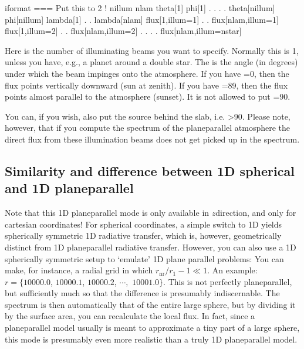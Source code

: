 \documentclass[letterpaper,10pt,english]{sphinxmanual}
\begin{document}
\begin{sphinxVerbatim}[commandchars=\\\{\}]
iformat                           \PYGZlt{}=== Put this to 2 !
nillum     nlam
theta[1]      phi[1]
  .             .
  .             .
theta[nillum] phi[nillum]
lambda[1]
  .
  .
lambda[nlam]
flux[1,illum=1]
  .
  .
flux[nlam,illum=1]
flux[1,illum=2]
  .
  .
flux[nlam,illum=2]
  .
  .
  .
  .
flux[nlam,illum=nstar]
\end{sphinxVerbatim}

Here  is the number of illuminating beams you want to
specify. Normally this is 1, unless you have, e.g., a planet around a double
star. The  is the angle (in degrees) under which the beam impinges onto
the atmosphere. If you have =0, then the flux points vertically
downward (sun at zenith). If you have =89, then the flux points
almost parallel to the atmosphere (sunset). It is not allowed to put =90.

You can, if you wish, also put the source behind the slab, i.e. \textgreater{}90. Please note, however, that if you compute the spectrum of the
plane\sphinxhyphen{}parallel atmosphere the direct flux from these illumination beams does not
get picked up in the spectrum.


\subsection{Similarity and difference between 1\sphinxhyphen{}D spherical and 1\sphinxhyphen{}D plane\sphinxhyphen{}parallel}
\label{\detokenize{gridding:similarity-and-difference-between-1-d-spherical-and-1-d-plane-parallel}}
Note that this 1\sphinxhyphen{}D plane\sphinxhyphen{}parallel mode is only available in \(z\)\sphinxhyphen{}direction,
and only for cartesian coordinates! For spherical coordinates, a simple switch
to 1\sphinxhyphen{}D yields spherically symmetric 1\sphinxhyphen{}D radiative transfer, which is, however,
geometrically distinct from 1\sphinxhyphen{}D plane\sphinxhyphen{}parallel radiative transfer. However, you
can also use a 1\sphinxhyphen{}D spherically symmetric setup to ‘emulate’ 1\sphinxhyphen{}D plane parallel
problems: You can make, for instance, a radial grid in which
\(r_{\mathrm{nr}}/r_1-1\ll 1\). An example: \(r=\{10000.0\),
\(10000.1\), \(10000.2\), \(\cdots,\) \(10001.0\}\). This is not
perfectly plane\sphinxhyphen{}parallel, but sufficiently much so that the difference is
presumably indiscernable.  The spectrum is then automatically that of the entire
large sphere, but by dividing it by the surface area, you can recalculate the
local flux.  In fact, since a plane\sphinxhyphen{}parallel model usually is meant to
approximate a tiny part of a large sphere, this mode is presumably even more
realistic than a truly 1\sphinxhyphen{}D plane\sphinxhyphen{}parallel model.
\end{document}
